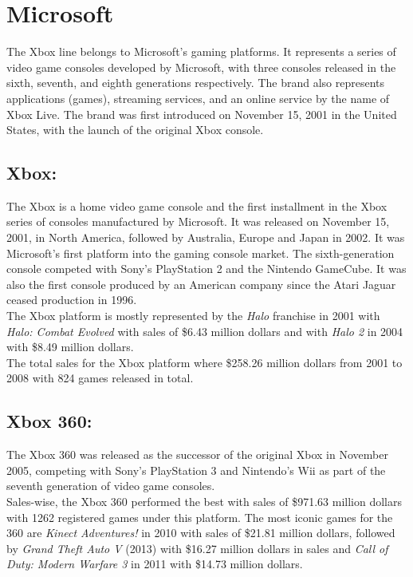 \section{Microsoft}
The Xbox line belongs to Microsoft's gaming platforms. It represents a
series of video game consoles developed by Microsoft, with three consoles
released in the sixth, seventh, and eighth generations respectively. The
brand also represents applications (games), streaming services, and an online
service by the name of Xbox Live. The brand was first introduced on November
15, 2001 in the United States, with the launch of the original Xbox
console\cite{Microsoft}.\\

\subsection{Xbox:}
The Xbox is a home video game console and the first installment in the Xbox
series of consoles manufactured by Microsoft. It was released on November 15,
2001, in North America, followed by Australia, Europe and Japan in 2002.
It was Microsoft's first platform into the gaming console market. The
sixth-generation console competed with Sony's PlayStation 2 and the Nintendo
GameCube. It was also the first console produced by an American company since
the Atari Jaguar ceased production in 1996\cite{Microsoft}.\\
The Xbox platform is mostly represented by the \textit{Halo} franchise in
2001 with \textit{Halo: Combat Evolved} with sales of \$6.43 million dollars
and with \textit{Halo 2} in 2004 with \$8.49 million dollars.\\
The total sales for the Xbox platform where \$258.26 million dollars from
2001 to 2008 with 824 games released in total.
\subsection{Xbox 360:}
The Xbox 360 was released as the successor of the original Xbox in November
2005, competing with Sony's PlayStation 3 and Nintendo's Wii as part of the
seventh generation of video game consoles\cite{Microsoft}.\\
Sales-wise, the Xbox 360 performed the best with sales of \$971.63 million
dollars with 1262 registered games under this platform. The most iconic games
for the 360 are \textit{Kinect Adventures!} in 2010 with sales of \$21.81 million
dollars, followed by \textit{Grand Theft Auto V} (2013) with \$16.27 million dollars
in sales and \textit{Call of Duty: Modern Warfare 3} in 2011 with \$14.73
million dollars.
